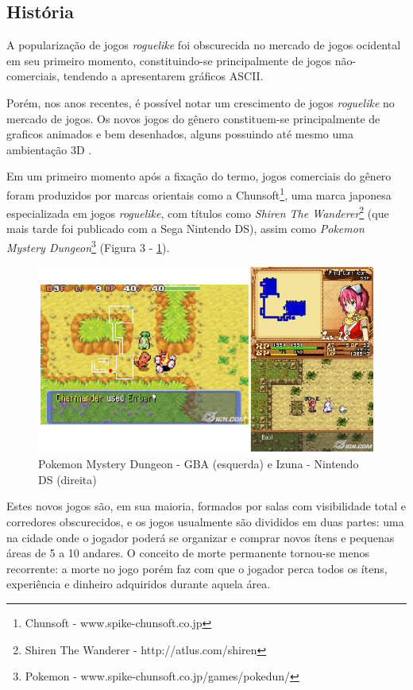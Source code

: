 	\subsection{História}

A popularização de jogos \textit{roguelike} foi obscurecida no mercado de jogos ocidental em seu primeiro momento, constituindo-se principalmente de jogos não-comerciais, tendendo a apresentarem gráficos ASCII. 


Porém, nos anos recentes, é possível notar um crescimento de jogos \textit{roguelike} no mercado de jogos. Os novos jogos do gênero constituem-se principalmente de graficos animados e bem desenhados, alguns possuindo até mesmo uma ambientação 3D \cite{gamestoplay}.


Em um primeiro momento após a fixação do termo, jogos comerciais do gênero foram produzidos por marcas orientais como a Chunsoft\footnote{Chunsoft - www.spike-chunsoft.co.jp}, uma marca japonesa especializada em jogos \textit{roguelike}, com títulos como \textit{Shiren The Wanderer}\footnote{Shiren The Wanderer - http://atlus.com/shiren} (que mais tarde foi publicado com a Sega  Nintendo DS), assim como \textit{Pokemon Mystery Dungeon}\footnote{Pokemon - www.spike-chunsoft.co.jp/games/pokedun/} (Figura 3 - \ref{fig03}). 

\begin{figure}[h]
	\centering
	\label{fig03}
		\includegraphics[keepaspectratio=true,scale=0.3]{figuras/fig03-pok_izu.png}
	\caption{Pokemon Mystery Dungeon - GBA (esquerda) e Izuna - Nintendo DS (direita) }
\end{figure}



Estes novos jogos são, em sua maioria, formados por salas com visibilidade total e corredores obscurecidos, e os jogos usualmente são divididos em duas partes: uma na cidade onde o jogador poderá se organizar e comprar novos ítens e pequenas áreas de 5 a 10 andares. O conceito de morte permanente tornou-se menos recorrente: a morte no jogo porém faz com que o jogador perca todos os ítens, experiência e dinheiro adquiridos durante aquela área.


